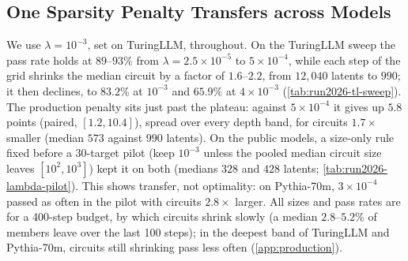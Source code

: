 \documentclass[10pt]{article}
\begin{document}
\subsection{One Sparsity Penalty Transfers across Models}
\label{sec:lambda-transfer}
We use $\lambda = 10^{-3}$, set on TuringLLM, throughout.
On the TuringLLM sweep the pass rate holds at $89$--$93\%$ from $\lambda = 2.5 \times 10^{-5}$ to $5 \times 10^{-4}$, while each step of the grid shrinks the median circuit by a factor of $1.6$--$2.2$, from $12{,}040$ latents to $990$; it then declines, to $83.2\%$ at $10^{-3}$ and $65.9\%$ at $4 \times 10^{-3}$ (\cref{tab:run2026-tl-sweep}).
The production penalty sits just past the plateau: against $5 \times 10^{-4}$ it gives up $5.8$ points (paired, $[1.2, 10.4]$), spread over every depth band, for circuits $1.7\times$ smaller (median $573$ against $990$ latents).
On the public models, a size-only rule fixed before a $30$-target pilot (keep $10^{-3}$ unless the pooled median circuit size leaves $[10^{2}, 10^{3}]$) kept it on both (medians $328$ and $428$ latents; \cref{tab:run2026-lambda-pilot}).
This shows transfer, not optimality: on Pythia-70m, $3 \times 10^{-4}$ passed as often in the pilot with circuits $2.8\times$ larger.
All sizes and pass rates are for a 400-step budget, by which circuits shrink slowly (a median $2.8$--$5.2\%$ of members leave over the last 100 steps); in the deepest band of TuringLLM and Pythia-70m, circuits still shrinking pass less often (\cref{app:production}).
\end{document}
